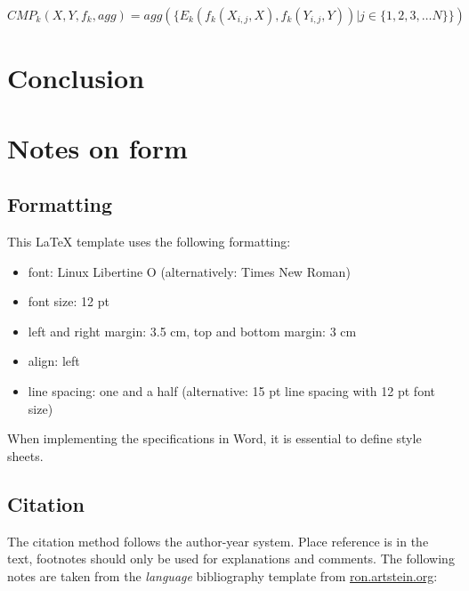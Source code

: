 \documentclass[12pt,letterpaper,ngerman]{article}
\begin{document}
\[ CMP_k(X,Y,f_k,agg) = agg(\{E_k(f_k(X_{i,j},X),f_k(Y_{i,j},Y)) | j \in \{1,2,3, \dots N\}\})\]


\section{Conclusion}


\section{Notes on form}
\subsection{Formatting} 
This LaTeX template uses the following formatting:
\begin{itemize}
\setlength{\itemsep}{0pt}
	\item font: Linux Libertine O (alternatively: Times New Roman)
	\item font size: 12 pt
	\item left and right margin: 3.5 cm, top and bottom margin: 3 cm
    \item align: left
	\item line spacing: one and a half (alternative: 15 pt line spacing with 12 pt font size)
\end{itemize}

\noindent
When implementing the specifications in Word, it is essential to define style sheets.

\subsection{Citation} 
\label{sec:cit}

The citation method follows the author-year system. Place reference is in the text, footnotes should only be used for explanations and comments. The following notes are taken from the \emph{language} bibliography template from \url{ron.artstein.org}:\newline
\end{document}

